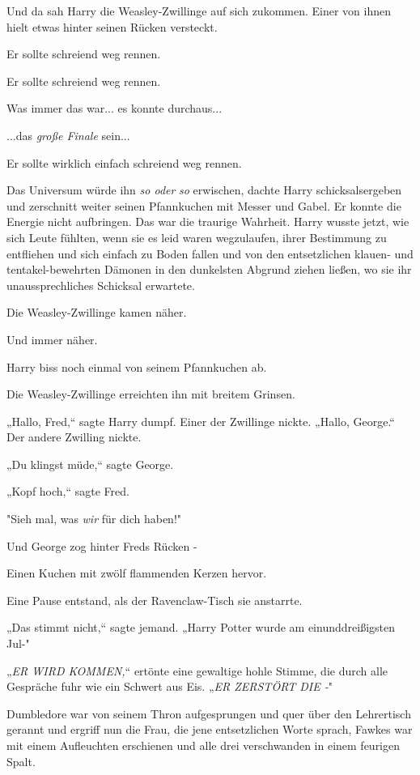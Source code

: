 {Und da sah Harry die Weasley-Zwillinge auf sich zukommen. Einer von ihnen hielt etwas hinter seinen Rücken versteckt.

Er sollte schreiend weg rennen.

Er sollte schreiend weg rennen.

Was immer das war... es konnte durchaus...

...das \emph{große Finale} sein...

Er sollte wirklich einfach schreiend weg rennen.

Das Universum würde ihn \emph{so oder} \emph{so} erwischen, dachte Harry schicksalsergeben und zerschnitt weiter seinen Pfannkuchen mit Messer und Gabel. Er konnte die Energie nicht aufbringen. Das war die traurige Wahrheit. Harry wusste jetzt, wie sich Leute fühlten, wenn sie es leid waren wegzulaufen, ihrer Bestimmung zu entfliehen und sich einfach zu Boden fallen und von den entsetzlichen klauen- und tentakel-bewehrten Dämonen in den dunkelsten Abgrund ziehen ließen, wo sie ihr unaussprechliches Schicksal erwartete.

Die Weasley-Zwillinge kamen näher.

Und immer näher.

Harry biss noch einmal von seinem Pfannkuchen ab.

Die Weasley-Zwillinge erreichten ihn mit breitem Grinsen.

„Hallo, Fred,“ sagte Harry dumpf. Einer der Zwillinge nickte. „Hallo, George.“ Der andere Zwilling nickte.

„Du klingst müde,“ sagte George.

„Kopf hoch,“ sagte Fred.

"Sieh mal, was \emph{wir} für dich haben!"

Und George zog hinter Freds Rücken -

Einen Kuchen mit zwölf flammenden Kerzen hervor.

Eine Pause entstand, als der Ravenclaw-Tisch sie anstarrte.

„Das stimmt nicht,“ sagte jemand. „Harry Potter wurde am einunddreißigsten Jul-"

„\emph{ER WIRD KOMMEN,}“ ertönte eine gewaltige hohle Stimme, die durch alle Gespräche fuhr wie ein Schwert aus Eis. „\emph{ER ZERSTÖRT DIE -}"

Dumbledore war von seinem Thron aufgesprungen und quer über den Lehrertisch gerannt und ergriff nun die Frau, die jene entsetzlichen Worte sprach, Fawkes war mit einem Aufleuchten erschienen und alle drei verschwanden in einem feurigen Spalt.

}
